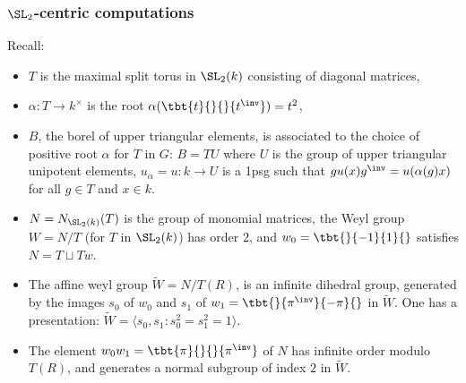 \documentclass{book}
\begin{document}
\subsubsection*{$\SL_2$-centric computations}
Recall:
\begin{itemize}
    \item $T$ is the maximal split torus in $\SL_2(k)$ consisting of diagonal matrices,
    \item $\alpha : T \to k^\times$ is the root $\alpha(\tbt{t}{}{}{t^\inv}) = t^2$,
    \item $B$, the borel of upper triangular elements, is associated to the choice of positive root $\alpha$ for $T$ in $G$: $B = TU$ where $U$ is the group of upper triangular unipotent elements, $u_\alpha = u : k \to U$ is a 1psg such that $g u(x) g^\inv = u(\alpha(g) x)$ for all $g\in T$ and $x \in k$.
    \item $N = N_{\SL_2(k)}(T)$ is the group of monomial matrices, the Weyl group $W=N/T$ (for $T$ in $\SL_2(k)$) has order $2$, and $w_0 = \tbt{}{-1}{1}{}$  satisfies $N = T \sqcup Tw$.
    \item The affine weyl group $\tilde{W} = N/T(R)$, is an infinite dihedral group, generated by the images $s_0$ of $w_0$  and  $s_1$ of $w_1 = \tbt{}{\pi^\inv}{-\pi}{}$ in $\tilde{W}$. One has a presentation: $\tilde{W}= \langle s_0,s_1:  s_0^2 = s_1^2 = 1\rangle$.
    \item The element $w_0 w_1 = \tbt{\pi}{}{}{\pi^\inv}$ of $N$ has infinite order modulo $T(R)$, and generates a normal subgroup of index $2$ in $\tilde{W}$.
\end{itemize}
\end{document}
